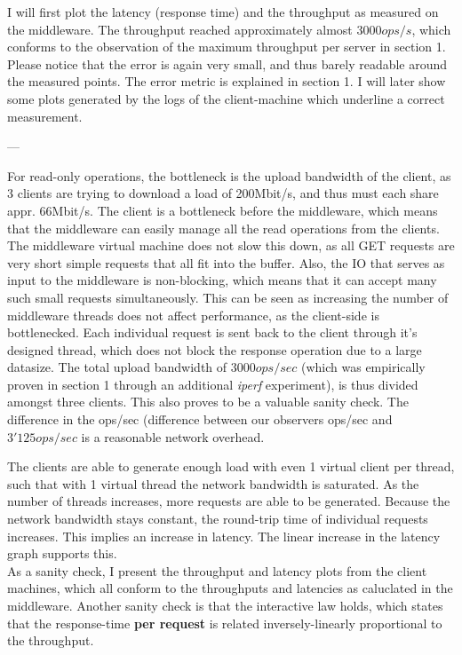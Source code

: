 \documentclass[11pt,a4paper]{article}
\begin{document}
I will first plot the latency (response time) and the throughput as measured on the middleware.
The throughput reached approximately almost $3000ops/s$, which conforms to the observation of the maximum throughput per server in section 1.
Please notice that the error is again very small, and thus barely readable around the measured points.
The error metric is explained in section 1.
I will later show some plots generated by the logs of the client-machine which underline a correct measurement.

---


For read-only operations, the bottleneck is the upload bandwidth of the client,
as 3 clients are trying to download a load of 200Mbit/s, and thus must each share appr. 66Mbit/s.
The client is a bottleneck before the middleware, which means that the middleware can easily manage all the read operations from the clients.
The middleware virtual machine does not slow this down, as all GET requests are very short simple requests that all fit into the buffer.
Also, the IO that serves as input to the middleware is non-blocking, which means that it can accept many such small requests simultaneously.
This can be seen as increasing the number of middleware threads does not affect performance, as the client-side is bottlenecked.
Each individual request is sent back to the client through it's designed thread, which does not block the response operation due to a large datasize.
The total upload bandwidth of $3000ops/sec$ (which was empirically proven in section 1 through an additional \textit{iperf} experiment), is thus divided amongst  three clients.
This also proves to be a valuable sanity check.
The difference in the ops/sec (difference between our observers ops/sec and $3'125 ops/sec$ is a reasonable network overhead. 

The clients are able to generate enough load with even 1 virtual client per thread, such that with 1 virtual thread the network bandwidth is saturated.
As the number of threads increases, more requests are able to be generated.
Because the network bandwidth stays constant, the round-trip time of individual requests increases.
This implies an increase in latency.
The linear increase in the latency graph supports this. \\

As a sanity check, I present the throughput and latency plots from the client machines, which all conform to the throughputs and latencies as caluclated in the middleware.
Another sanity check is that the interactive law holds, which states that the response-time \textbf{per request}  is related inversely-linearly proportional to the throughput.
\end{document}
